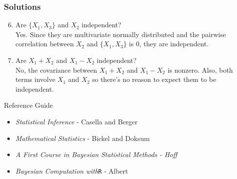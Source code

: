 \documentclass{beamer}
\begin{document}
\begin{frame}
\frametitle{Solutions}
\begin{enumerate}
\setcounter{enumi}{5}

\item Are $\{X_1, X_3\}$ and $X_2$ independent?\\
Yes.  Since they are multivariate normally distributed and the pairwise correlation between $X_2$ and $\{X_1, X_3\}$ is 0, they are independent.

\item Are $X_1 + X_2$ and $X_1 - X_2$ independent?\\
No, the covariance between  $X_1 + X_2$ and $X_1 - X_2$ is nonzero.  Also, both terms involve $X_1$ and $X_2$ so there's no reason to expect them to be independent.  
\end{enumerate}
\end{frame}

\begin{frame}{Reference Guide}
\begin{itemize}
\item{\emph{Statistical Inference} - Casella and Berger}
\item{\emph{Mathematical Statistics} - Bickel and Doksum}
\item{\emph{A First Course in Bayesian Statistical Methods - Hoff}}
\item{\emph{Bayesian Computation with}\texttt{R} - Albert}
\end{itemize}
\end{frame}
\end{document}
